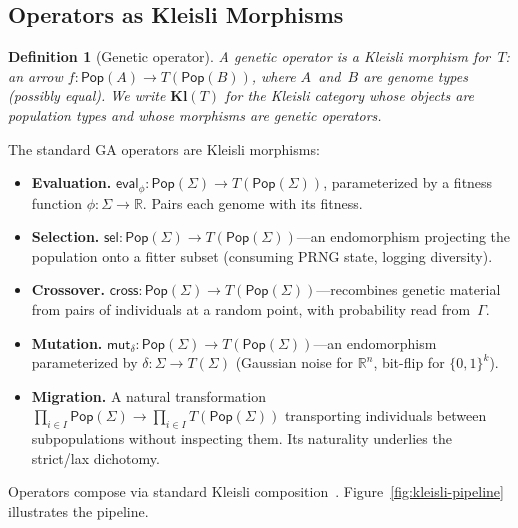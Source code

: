 \documentclass[submission,copyright,creativecommons]{eptcs}
\newtheorem{definition}{Definition}
\begin{document}
\subsection{Operators as Kleisli Morphisms}
\label{sec:kleisli-ops}

\begin{definition}[Genetic operator]
A \emph{genetic operator} is a Kleisli morphism for~$T$:
an arrow $f : \mathsf{Pop}(A) \to T(\mathsf{Pop}(B))$, where $A$~and~$B$
are genome types (possibly equal). We write $\mathbf{Kl}(T)$ for the
Kleisli category whose objects are population types and whose morphisms
are genetic operators.
\end{definition}

The standard GA operators are Kleisli morphisms:
\begin{itemize}
\item \textbf{Evaluation.} $\mathsf{eval}_\phi : \mathsf{Pop}(\Sigma) \to
  T(\mathsf{Pop}(\Sigma))$, parameterized by a fitness function
  $\phi : \Sigma \to \mathbb{R}$. Pairs each genome with its fitness.

\item \textbf{Selection.} $\mathsf{sel} : \mathsf{Pop}(\Sigma) \to
  T(\mathsf{Pop}(\Sigma))$---an endomorphism projecting the
  population onto a fitter subset (consuming PRNG state, logging
  diversity).

\item \textbf{Crossover.} $\mathsf{cross} : \mathsf{Pop}(\Sigma) \to
  T(\mathsf{Pop}(\Sigma))$---recombines genetic material from pairs
  of individuals at a random point, with probability read from~$\Gamma$.

\item \textbf{Mutation.} $\mathsf{mut}_\delta : \mathsf{Pop}(\Sigma)
  \to T(\mathsf{Pop}(\Sigma))$---an endomorphism parameterized by
  $\delta : \Sigma \to T(\Sigma)$
  (Gaussian noise for $\mathbb{R}^n$, bit-flip for $\{0,1\}^k$).

\item \textbf{Migration.} A natural transformation
  $\prod_{i \in I} \mathsf{Pop}(\Sigma) \to
  \prod_{i \in I} T(\mathsf{Pop}(\Sigma))$
  transporting individuals between subpopulations without inspecting
  them. Its naturality underlies the strict/lax dichotomy.
\end{itemize}

Operators compose via standard Kleisli composition~\cite{moggi1991notions}.
Figure~\ref{fig:kleisli-pipeline} illustrates the pipeline.
\end{document}
